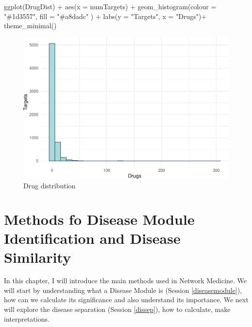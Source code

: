 \documentclass[
]{book}
\newenvironment{Shaded}{\begin{snugshade}}{\end{snugshade}}
\newcommand{\AttributeTok}[1]{\textcolor[rgb]{0.77,0.63,0.00}{#1}}
\newcommand{\FunctionTok}[1]{\textcolor[rgb]{0.00,0.00,0.00}{#1}}
\newcommand{\NormalTok}[1]{#1}
\newcommand{\SpecialCharTok}[1]{\textcolor[rgb]{0.00,0.00,0.00}{#1}}
\newcommand{\StringTok}[1]{\textcolor[rgb]{0.31,0.60,0.02}{#1}}
\begin{document}
\begin{Shaded}
\begin{Highlighting}[]
\FunctionTok{ggplot}\NormalTok{(DrugDist) }\SpecialCharTok{+}
  \FunctionTok{aes}\NormalTok{(}\AttributeTok{x =}\NormalTok{ numTargets) }\SpecialCharTok{+}
  \FunctionTok{geom\_histogram}\NormalTok{(}\AttributeTok{colour =} \StringTok{"\#1d3557"}\NormalTok{, }\AttributeTok{fill =} \StringTok{"\#a8dadc"}\NormalTok{ ) }\SpecialCharTok{+}
  \FunctionTok{labs}\NormalTok{(}\AttributeTok{y =} \StringTok{"Targets"}\NormalTok{, }\AttributeTok{x =} \StringTok{"Drugs"}\NormalTok{)}\SpecialCharTok{+}
  \FunctionTok{theme\_minimal}\NormalTok{()}
\end{Highlighting}
\end{Shaded}

\begin{figure}
\centering
\includegraphics{NetMed_files/figure-latex/unnamed-chunk-19-1.pdf}
\caption{\label{fig:unnamed-chunk-19}Drug distribution}
\end{figure}

\hypertarget{methods}{%
\chapter{Methods fo Disease Module Identification and Disease Similarity}\label{methods}}

In this chapter, I will introduce the main methods used in Network Medicine. We will start by understanding what a Disease Module is (Session \ref{diseasemodule}), how can we calculate its significance and also understand its importance. We next will explore the disease separation (Session \ref{dissep}), how to calculate, make interpretations.
\end{document}
